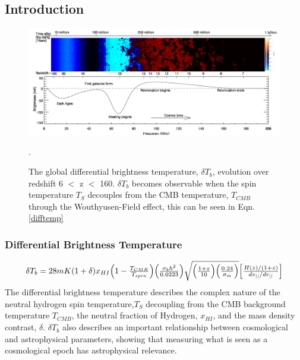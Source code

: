 \documentclass[a0,landscape]{a0poster}
\begin{document}
\begin{multicols}{4}
\begin{abstract}
\end{abstract}


\color{SaddleBrown} %

\section*{Introduction}

\begin{figure}[H]
\centering
\includegraphics[width=1.0\linewidth]{figures/global_history.png}
\caption{The global differential brightness temperature, $\delta T_b$, evolution over redshift 6 $<$ z $<$ 160. $\delta T_b$ becomes observable when 
the spin temperature $T_S$ decouples from the CMB temperature, $T_{CMB}$ through the Wouthyusen-Field effect, this can be seen in 
Eqn. \ref{difftemp}}.
\end{figure}


\subsubsection*{Differential Brightness Temperature}
\begin{equation}
\label{difftemp}
\resizebox{.9\hsize}{!}{$
\delta T_{b} = 28mK(1+\delta)x_{HI}\Big(1-\frac{T_{CMB}}{T_{spin}}\Big)\Big(\frac{\sigma_{b}h^2}{0.0223}\Big)\sqrt{\Big(\frac{1+z}{10}\Big)\Big(\frac{0.24}{\sigma_m}\Big)}\Big[ \frac{H(z)/(1+z)}{dv_{||}/dr_{||}}\Big]$}
\end{equation}
The differential brightness temperature describes the complex nature of the neutral hydrogen spin temperature,$T_S$ decoupling from the CMB background temperature $T_{CMB}$, the neutral fraction of Hydrogen, $x_{HI}$, and the mass density contrast, $\delta$.
$\delta T_b$ also describes an important relationship between cosmological and astrophysical parameters, showing that measuring what is seen as a cosmological epoch has astrophysical relevance. 



\end{multicols}
\end{document}
